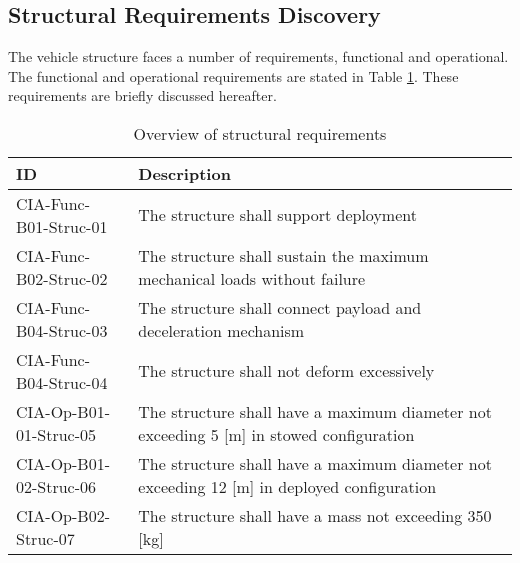 \subsection{Structural Requirements Discovery} \label{sec:struct}
The vehicle structure faces a number of requirements, functional and operational. The functional and operational requirements are stated in Table \ref{tab:strucfuncrequirements}. These requirements are briefly discussed hereafter.
\begin{table}[H]
	\caption{Overview of structural requirements}	 \label{tab:strucfuncrequirements}
	\begin{tabular}{|p{}|p{}|}
    \hline
    ID          & Description                                                                                                      \\ \hline \hline
    CIA-Func-B01-Struc-01 & The structure shall support deployment \\ \hline
    CIA-Func-B02-Struc-02 & The structure shall sustain the maximum mechanical loads without failure                           \\ \hline
    CIA-Func-B04-Struc-03 & The structure shall connect payload and deceleration mechanism \\ \hline
    CIA-Func-B04-Struc-04 & The structure shall not deform excessively \\ \hline
    CIA-Op-B01-01-Struc-05 & The structure shall have a maximum diameter not exceeding 5 [m] in stowed configuration                              \\ \hline
    CIA-Op-B01-02-Struc-06 & The structure shall have a maximum diameter not exceeding 12 [m] in deployed configuration     \\ \hline
    CIA-Op-B02-Struc-07 & The structure shall have a mass not exceeding 350 [kg]\\ \hline
    \end{tabular}
\end{table}
